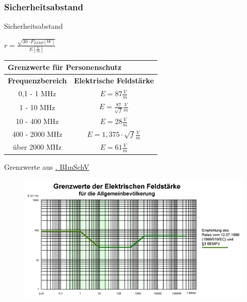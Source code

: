\begin{frame}
  \frametitle{Sicherheitsabstand}
  \begin{block}{Sicherheitsabstand}
    \begin{LARGE}
      $r = \frac{\sqrt{30 \cdot P_{EIRP}[W]}}{E[\frac{V}{m}]}$
    \end{LARGE}
  \end{block}
  \vspace{1em}
  \begin{center}
    \begin{tabular}{|c|c|}
      \hline
      \multicolumn{2}{|l|}{\textbf{Grenzwerte für Personenschutz}} \\ \hline
      \textbf{Frequenzbereich} & \textbf{Elektrische Feldstärke} \\ \hline
      0,1 - 1 MHz & $E = 87 \frac{V}{m}$ \\ \hline
      1 - 10 MHz & $E = \frac{87}{\sqrt{f}} \frac{V}{m}$ \\ \hline
      10 - 400 MHz & $E = 28 \frac{V}{m}$ \\ \hline
      400 - 2000 MHz & $E = 1,375 \cdot \sqrt{f} \frac{V}{m}$ \\ \hline
      über 2000 MHz & $E = 61 \frac{V}{m}$ \\ \hline
    \end{tabular}
  \end{center}
  Grenzwerte aus \href{https://www.gesetze-im-internet.de/bimschv\_26/anhang\_1.html}{. BImSchV}
\end{frame}

\begin{frame}
  \begin{figure}
    \includegraphics[width=\textwidth,height=.8\textheight,keepaspectratio]{e18/E_grenzkurve_gr.png}
  \end{figure}
\end{frame}

